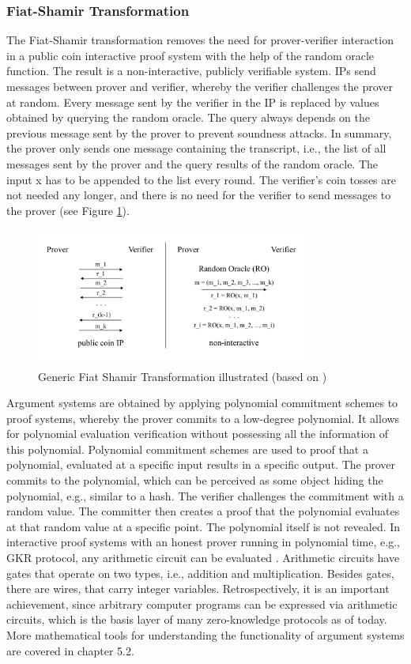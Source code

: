 \subsubsection{Fiat-Shamir Transformation}
The Fiat-Shamir transformation \citep{ROMFiat1986HowTP} removes the need for prover-verifier interaction in a public coin interactive proof system with the help of the random oracle function. The result is a non-interactive, publicly verifiable system. IPs send messages between prover and verifier, whereby the verifier challenges the prover at random. Every message sent by the verifier in the IP is replaced by values obtained by querying the random oracle. The query always depends on the previous message sent by the prover to prevent soundness attacks. In summary, the prover only sends one message containing the transcript, i.e., the list of all messages sent by the prover and the query results of the random oracle. The input x has to be appended to the list every round. The verifier's coin tosses are not needed any longer, and there is no need for the verifier to send messages to the prover (see Figure \ref{fig:FST}).

\begin{figure}[hbt]
	\centering
		\includegraphics[width=0.8\textwidth]{Pictures/FST.png}
	\caption{Generic Fiat Shamir Transformation illustrated (based on \citet{Thaler})}
	\label{fig:FST}
\end{figure}
Argument systems are obtained by applying polynomial commitment schemes to proof systems, whereby the prover commits to a low-degree polynomial. It allows for polynomial evaluation verification without possessing all the information of this polynomial.  Polynomial commitment schemes are used to proof that a polynomial, evaluated at a specific input results in a specific output. The prover commits to the polynomial, which can be perceived as some object hiding the polynomial, e.g., similar to a hash. The verifier challenges the commitment with a random value. The committer then creates a proof that the polynomial evaluates at that random value at a specific point. The polynomial itself is not revealed. In interactive proof systems with an honest prover running in polynomial time, e.g., GKR protocol, any arithmetic circuit can be evaluated \citep{GKR10.1145/1374376.1374396}. Arithmetic circuits have gates that operate on two types, i.e., addition and multiplication. Besides gates, there are wires, that carry integer variables. Retrospectively, it is an important achievement, since arbitrary computer programs can be expressed via arithmetic circuits, which is the basis layer of many zero-knowledge protocols as of today. More mathematical tools for understanding the functionality of argument systems are covered in chapter 5.2.
